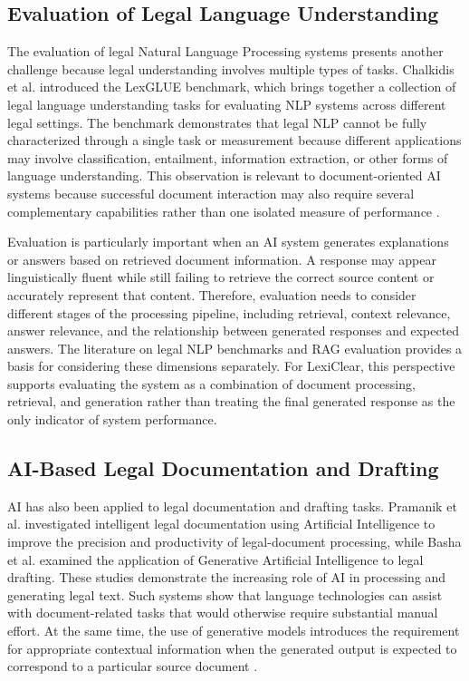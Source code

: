 \documentclass[12pt,a4paper,oneside]{report}
\begin{document}
\subsection{Evaluation of Legal Language Understanding}

The evaluation of legal Natural Language Processing systems presents another
challenge because legal understanding involves multiple types of tasks.
Chalkidis et al. introduced the LexGLUE benchmark, which brings together a
collection of legal language understanding tasks for evaluating NLP systems
across different legal settings. The benchmark demonstrates that legal NLP
cannot be fully characterized through a single task or measurement because
different applications may involve classification, entailment, information
extraction, or other forms of language understanding. This observation is
relevant to document-oriented AI systems because successful document
interaction may also require several complementary capabilities rather than
one isolated measure of performance
\cite{chalkidis2022lexglue}.

Evaluation is particularly important when an AI system generates explanations
or answers based on retrieved document information. A response may appear
linguistically fluent while still failing to retrieve the correct source
content or accurately represent that content. Therefore, evaluation needs to
consider different stages of the processing pipeline, including retrieval,
context relevance, answer relevance, and the relationship between generated
responses and expected answers. The literature on legal NLP benchmarks and
RAG evaluation provides a basis for considering these dimensions separately.
For LexiClear, this perspective supports evaluating the system as a
combination of document processing, retrieval, and generation rather than
treating the final generated response as the only indicator of system
performance\cite{es2024ragas,zhang2020bertscore}.

\subsection{AI-Based Legal Documentation and Drafting}

AI has also been applied to legal documentation and drafting tasks. Pramanik
et al. investigated intelligent legal documentation using Artificial
Intelligence to improve the precision and productivity of legal-document
processing, while Basha et al. examined the application of Generative
Artificial Intelligence to legal drafting. These studies demonstrate the
increasing role of AI in processing and generating legal text. Such systems
show that language technologies can assist with document-related tasks that
would otherwise require substantial manual effort. At the same time, the use
of generative models introduces the requirement for appropriate contextual
information when the generated output is expected to correspond to a
particular source document
\cite{pramanik2025,basha2024}.
\end{document}
